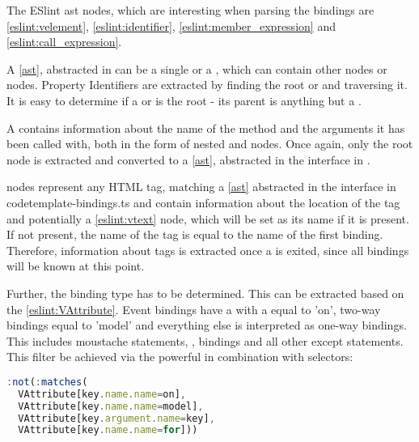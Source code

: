 The ESlint \gls{ast} nodes, which are interesting when parsing the bindings are  \ref{eslint:velement}, 
 \ref{eslint:identifier},  \ref{eslint:member_expression} and  \ref{eslint:call_expression}. 

A  \ref{ast}, abstracted
in   can be a single  or a , which can contain other  nodes or  nodes. Property Identifiers are extracted by finding the root  or  and traversing it. It is easy to determine if a  or  is the root - its parent is anything but a .

A  contains information about the name of the method and the arguments it has been called with, both in the form of nested  and  nodes. Once again, only the root  node is extracted and converted to a  \ref{ast}, abstracted in the  interface in .

 nodes represent any HTML tag, matching a  \ref{ast} abstracted in the  interface in code{template-bindings.ts} and contain information about the location of the tag and potentially a  \ref{eslint:vtext} node, which will be set as its name if it is present. If not present, the name of the tag is equal to the name of the first binding. Therefore, information about tags is extracted once a  is exited, since all bindings will be known at this point.

Further, the binding type has to be determined. This can be extracted based on the  \ref{eslint:VAttribute}. Event bindings have a  with a  equal to 'on', two-way bindings equal to 'model' and everything else is interpreted as one-way bindings. This includes moustache statements, ,  bindings and all other except  statements. This filter be achieved via the powerful  in combination with  selectors: 
\begin{lstlisting}[language=JavaScript]
:not(:matches(
  VAttribute[key.name.name=on], 
  VAttribute[key.name.name=model],
  VAttribute[key.argument.name=key],
  VAttribute[key.name.name=for]))
\end{lstlisting}

